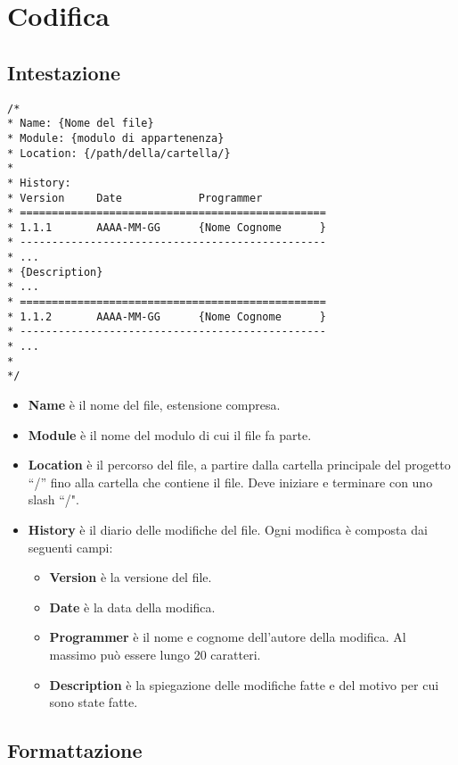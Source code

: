\section{Codifica}

\subsection{Intestazione}

\begin{lstlisting}
/*
* Name: {Nome del file}
* Module: {modulo di appartenenza}
* Location: {/path/della/cartella/}
*
* History:
* Version     Date            Programmer    
* ================================================
* 1.1.1       AAAA-MM-GG      {Nome Cognome      }
* ------------------------------------------------
* ...
* {Description}
* ...
* ================================================
* 1.1.2       AAAA-MM-GG      {Nome Cognome      }
* ------------------------------------------------
* ...
*
*/
\end{lstlisting}

\begin{itemize}
 \item \textbf{Name} è il nome del file, estensione compresa.
 \item \textbf{Module} è il nome del modulo di cui il file fa parte.
 \item \textbf{Location} è il percorso del file, a partire dalla cartella principale del progetto ``/'' fino alla cartella che contiene il file. Deve iniziare e terminare con uno slash ``/".
 \item \textbf{History} è il diario delle modifiche del file. Ogni modifica è composta dai seguenti campi:
 
	\begin{itemize}
	 \item \textbf{Version} è la versione del file.
	 \item \textbf{Date} è la data della modifica.
	 \item \textbf{Programmer} è il nome e cognome dell'autore della modifica. Al massimo può essere lungo 20 caratteri.
	 \item \textbf{Description} è la spiegazione delle modifiche fatte e del motivo per cui sono state fatte.	 
	\end{itemize}
\end{itemize}

\subsection{Formattazione}


